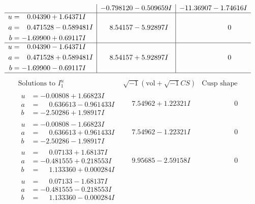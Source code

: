 \documentclass[1p]{elsarticle_modified}
\theoremstyle{definition}
\newcommand{\I}{\sqrt{-1}}
\begin{document}
$$\begin{array}{c|c|c}
 & -0.798120 - 0.509659 I & -11.36907 - 1.74616 I \\ \hline\begin{aligned}
u &= \phantom{-}0.04390 + 1.64371 I \\
a &= \phantom{-}0.471528 - 0.589481 I \\
b &= -1.69900 + 0.69117 I\end{aligned}
 & \phantom{-}8.54157 - 5.92897 I & \phantom{-0.000000 } 0 \\ \hline\begin{aligned}
u &= \phantom{-}0.04390 - 1.64371 I \\
a &= \phantom{-}0.471528 + 0.589481 I \\
b &= -1.69900 - 0.69117 I\end{aligned}
 & \phantom{-}8.54157 + 5.92897 I & \phantom{-0.000000 } 0\\
 \hline 
 \end{array}$$\newpage$$\begin{array}{c|c|c}  
\text{Solutions to }I^u_{1}& \I (\text{vol} + \sqrt{-1}CS) & \text{Cusp shape}\\
 \hline 
\begin{aligned}
u &= -0.00808 + 1.66823 I \\
a &= \phantom{-}0.636613 - 0.961433 I \\
b &= -2.50286 + 1.98917 I\end{aligned}
 & \phantom{-}7.54962 + 1.22321 I & \phantom{-0.000000 } 0 \\ \hline\begin{aligned}
u &= -0.00808 - 1.66823 I \\
a &= \phantom{-}0.636613 + 0.961433 I \\
b &= -2.50286 - 1.98917 I\end{aligned}
 & \phantom{-}7.54962 - 1.22321 I & \phantom{-0.000000 } 0 \\ \hline\begin{aligned}
u &= \phantom{-}0.07133 + 1.68137 I \\
a &= -0.481555 + 0.218553 I \\
b &= \phantom{-}1.133360 + 0.000284 I\end{aligned}
 & \phantom{-}9.95685 - 2.59158 I & \phantom{-0.000000 } 0 \\ \hline\begin{aligned}
u &= \phantom{-}0.07133 - 1.68137 I \\
a &= -0.481555 - 0.218553 I \\
b &= \phantom{-}1.133360 - 0.000284 I\end{aligned}

\end{array}$$
\end{document}
